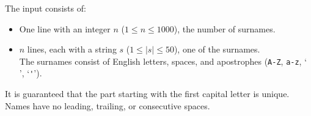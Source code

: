 
    The input consists of:
    \begin{itemize}
        \item One line with an integer $n$ ($1\leq n\leq 1000$), the number of surnames.
        \item $n$ lines, each with a string $s$ ($1\leq |s|\leq50$), one of the surnames. \\
            The surnames consist of English letters, spaces, and apostrophes
            (\texttt{A-Z}, \texttt{a-z}, `\texttt{ }', `\verb|'|').
    \end{itemize}
    It is guaranteed that the part starting with the first capital letter is unique.
    Names have no leading, trailing, or consecutive spaces.
